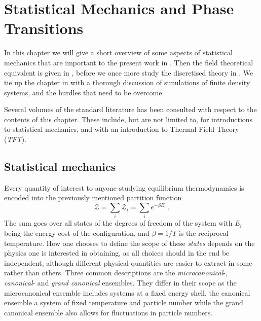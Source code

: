 \chapter{Statistical Mechanics and Phase Transitions}

In this chapter we will give a short overview of some aspects of statistical
mechanics that are important to the present work in .
Then the field theoretical equivalent is given in
, before we once more study the discretised
theory in . We tie up the chapter 
in  with a
thorough discussion of simulations of finite density systems, and the hurdles
that need to be overcome.

Several volumes of the standard literature has been consulted with respect to
the contents of this chapter. These include, but are not limited to,
\cite{landau2013statistical,pathria2011statistical} for introductions to
statistical mechanics, and \cite{kapusta2006finite} with an introduction to
Thermal Field Theory (\emph{TFT}).

\section{Statistical mechanics} \label{sec-stat-mech}

Every quantity of interest to anyone studying equilibrium thermodynamics is
encoded into the previously mentioned partition function
%
\begin{equation}
  \mathcal{Z} = \sum_i \mathcal{Z}_i = \sum_i e^{-\beta E_i} \,.
\end{equation}
%
The sum goes over all states of the degrees of freedom of the system with $E_i$
being the energy cost of the configuration, and $\beta = 1/T$ is the reciprocal
temperature. How one chooses to define the scope of these \emph{states} depends
on the physics one is interested in obtaining, as all choices should in the end
be independent, although different physical quantities are easier to extract in
some rather than others. Three common descriptions are the
\emph{microcanonical}-, \emph{canonical}- and \emph{grand canonical} ensembles.
They differ in their scope as the microcanonical ensemble includes systems at a
fixed energy shell, the canonical ensemble a system of fixed temperature and
particle number while the grand canonical ensemble also allows for fluctuations
in particle numbers.

